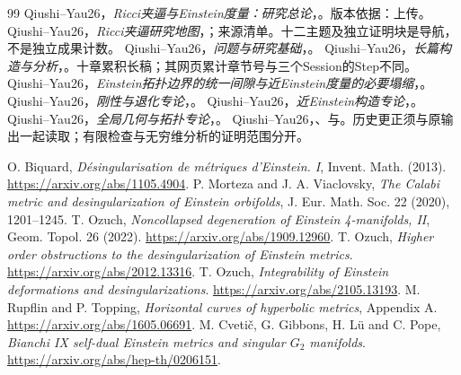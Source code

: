 \documentclass[UTF8,fontset=fandol,zihao=-4]{ctexart}
\theoremstyle{research}
\numberwithin{equation}{section}
\begin{document}
\begingroup\small
\begin{thebibliography}{99}
\setlength{\itemsep}{2pt}\setlength{\parskip}{0pt}\setlength{\parsep}{0pt}
 Qiushi--Yau26，\emph{Ricci夹逼与Einstein度量：研究总论}，。版本依据：上传。
 Qiushi--Yau26，\emph{Ricci夹逼研究地图}，；来源清单。十二主题及独立证明块是导航，不是独立成果计数。
 Qiushi--Yau26，\emph{问题与研究基础}，。
 Qiushi--Yau26，\emph{长篇构造与分析}，。十章累积长稿；其网页累计章节号与三个Session的Step不同。
 Qiushi--Yau26，\emph{Einstein拓扑边界的统一间隙与近Einstein度量的必要塌缩}，。
 Qiushi--Yau26，\emph{刚性与退化专论}，。
 Qiushi--Yau26，\emph{近Einstein构造专论}，。
 Qiushi--Yau26，\emph{全局几何与拓扑专论}，。
 Qiushi--Yau26，、与。历史更正须与原输出一起读取；有限检查与无穷维分析的证明范围分开。

 O. Biquard, \emph{Désingularisation de métriques d'Einstein. I}, Invent. Math. (2013). \url{https://arxiv.org/abs/1105.4904}.
 P. Morteza and J. A. Viaclovsky, \emph{The Calabi metric and desingularization of Einstein orbifolds}, J. Eur. Math. Soc. 22 (2020), 1201--1245.
 T. Ozuch, \emph{Noncollapsed degeneration of Einstein 4-manifolds, II}, Geom. Topol. 26 (2022). \url{https://arxiv.org/abs/1909.12960}.
 T. Ozuch, \emph{Higher order obstructions to the desingularization of Einstein metrics}. \url{https://arxiv.org/abs/2012.13316}.
 T. Ozuch, \emph{Integrability of Einstein deformations and desingularizations}. \url{https://arxiv.org/abs/2105.13193}.
 M. Rupflin and P. Topping, \emph{Horizontal curves of hyperbolic metrics}, Appendix A. \url{https://arxiv.org/abs/1605.06691}.
 M. Cvetič, G. Gibbons, H. Lü and C. Pope, \emph{Bianchi IX self-dual Einstein metrics and singular $G_2$ manifolds}. \url{https://arxiv.org/abs/hep-th/0206151}.

\end{thebibliography}
\endgroup
\end{document}
